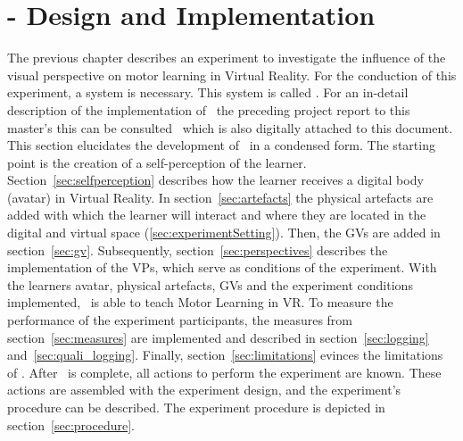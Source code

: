\chapter{\exgo - Design and Implementation}
\label{chapter:system}
The previous chapter describes an experiment to investigate the influence of the visual perspective on motor learning in Virtual Reality. For the conduction of this experiment, a system is necessary. This system is called \exgo. For an in-detail description of the implementation of \exgo\ the preceding project report to this master's this can be consulted~\cite{projectReport} which is also digitally attached to this document. This section elucidates the development of \exgo\ in a condensed form. The starting point is the creation of a self-perception of the learner. 
Section~\ref{sec:selfperception} describes how the learner receives a digital body (avatar) in Virtual Reality.
In section~\ref{sec:artefacts} the physical artefacts are added with which the learner will interact and where they are located in the digital and virtual space (\ref{sec:experimentSetting}). Then, the GVs are added in section~\ref{sec:gv}. Subsequently, section~\ref{sec:perspectives} describes the implementation of the VPs, which serve as conditions of the experiment. With the learners avatar, physical artefacts, GVs and the experiment conditions implemented, \exgo\ is able to teach Motor Learning in VR. To measure the performance of the experiment participants, the measures from section~\ref{sec:measures} are implemented and described in section~\ref{sec:logging} and~\ref{sec:quali_logging}. 
Finally, section~\ref{sec:limitations} evinces the limitations of \exgo.
After \exgo\ is complete, all actions to perform the experiment are known. These actions are assembled with the experiment design, and the experiment's procedure can be described. The experiment procedure is depicted in section~\ref{sec:procedure}.

